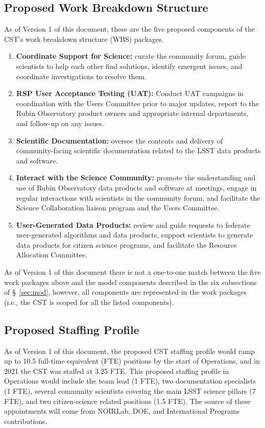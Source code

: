 \documentclass[DM,authoryear,toc]{lsstdoc}
\begin{document}
\subsection{Proposed Work Breakdown Structure}\label{ssec:comp_wbs}

As of Version 1 of this document, these are the five proposed components of the CST's work breakdown structure (WBS) packages.

\begin{enumerate}
\item \textbf{Coordinate Support for Science:} curate the community forum, guide scientists to help each other find solutions, identify emergent issues, and coordinate investigations to resolve them.
\item \textbf{RSP User Acceptance Testing (UAT):} Conduct UAT campaigns in coordination with the Users Committee prior to major updates, report to the Rubin Observatory product owners and appropriate internal departments, and follow-up on any issues.
\item \textbf{Scientific Documentation:} oversee the contents and delivery of community-facing scientific documentation related to the LSST data products and software. 
\item \textbf{Interact with the Science Community:} promote the understanding and use of Rubin Observatory data products and software at meetings, engage in regular interactions with scientists in the community forum, and facilitate the Science Collaboration liaison program and the Users Committee.
\item \textbf{User-Generated Data Products:} review and guide requests to federate user-generated algorithms and data products, support scientists to generate data products for citizen science programs, and facilitate the Resource Allocation Committee.
\end{enumerate}

As of Version 1 of this document there is not a one-to-one match between the five work packages above and the model components described in the six subsections of \S~\ref{sec:mod}, however, all components are represented in the work packages (i.e., the CST is scoped for all the listed components).


\subsection{Proposed Staffing Profile}\label{ssec:comp_staff}

As of Version 1 of this document, the proposed CST staffing profile would ramp up to 10.5 full-time equivalent (FTE) positions by the start of Operations, and in 2021 the CST was staffed at 3.25 FTE. 
This proposed staffing profile in Operations would include the team lead (1 FTE), two documentation specialists (1 FTE), several community scientists covering the main LSST science pillars (7 FTE), and two citizen-science related positions (1.5 FTE). 
The source of these appointments will come from NOIRLab, DOE, and International Programs contributions.
\end{document}

